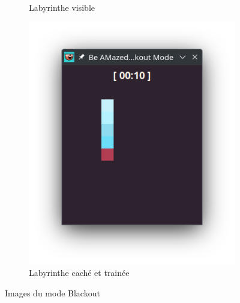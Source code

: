 \begin{figure}[!htb]
\begin{subfigure}[b]{0.3\textwidth}
        \caption{Labyrinthe visible}
    \end{subfigure}
    \hfill
    \begin{subfigure}[b]{0.3\textwidth}
        \includegraphics[width=\textwidth]{ressources/Implementation/Labyrinthe/Vue/Blackout/BlackoutDarkParticles.png}
        \caption{Labyrinthe caché et trainée}
    \end{subfigure}

    \caption{Images du mode Blackout}
\end{figure}
